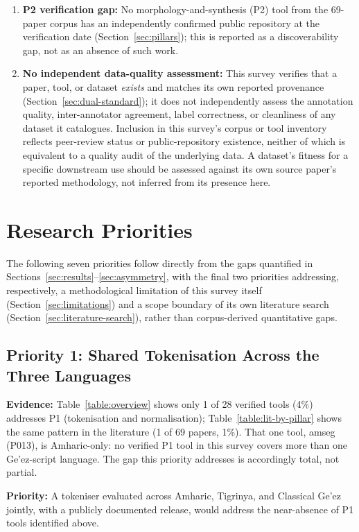 \documentclass[sn-mathphys-num]{sn-jnl}
\theoremstyle{thmstyleone}
\theoremstyle{thmstyletwo}
\theoremstyle{thmstylethree}
\begin{document}
\begin{enumerate}
    \item \textbf{P2 verification gap:} No morphology-and-synthesis (P2) tool from the 69-paper corpus has an independently confirmed public repository at the verification date (Section~\ref{sec:pillars}); this is reported as a discoverability gap, not as an absence of such work.
    \item \textbf{No independent data-quality assessment:} This survey verifies that a paper, tool, or dataset \emph{exists} and matches its own reported provenance (Section~\ref{sec:dual-standard}); it does not independently assess the annotation quality, inter-annotator agreement, label correctness, or cleanliness of any dataset it catalogues. Inclusion in this survey's corpus or tool inventory reflects peer-review status or public-repository existence, neither of which is equivalent to a quality audit of the underlying data. A dataset's fitness for a specific downstream use should be assessed against its own source paper's reported methodology, not inferred from its presence here.
\end{enumerate}

\section{Research Priorities}\label{sec:agenda}

The following seven priorities follow directly from the gaps quantified in Sections~\ref{sec:results}--\ref{sec:asymmetry}, with the final two priorities addressing, respectively, a methodological limitation of this survey itself (Section~\ref{sec:limitations}) and a scope boundary of its own literature search (Section~\ref{sec:literature-search}), rather than corpus-derived quantitative gaps.

\subsection{Priority 1: Shared Tokenisation Across the Three Languages}

\textbf{Evidence:} Table~\ref{table:overview} shows only 1 of 28 verified tools (4\%) addresses P1 (tokenisation and normalisation); Table~\ref{table:lit-by-pillar} shows the same pattern in the literature (1 of 69 papers, 1\%). That one tool, amseg (P013), is Amharic-only: no verified P1 tool in this survey covers more than one Ge'ez-script language. The gap this priority addresses is accordingly total, not partial.

\textbf{Priority:} A tokeniser evaluated across Amharic, Tigrinya, and Classical Ge'ez jointly, with a publicly documented release, would address the near-absence of P1 tools identified above.
\end{document}
